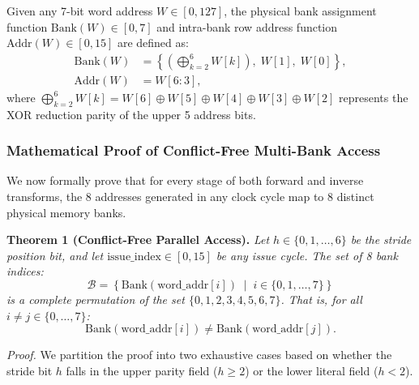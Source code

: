Given any 7-bit word address $W \in [0, 127]$, the physical bank assignment function $\text{Bank}(W) \in [0, 7]$ and intra-bank row address function $\text{Addr}(W) \in [0, 15]$ are defined as:
\begin{align}
\text{Bank}(W) &= \left\{ \left( \bigoplus_{k=2}^{6} W[k] \right), \; W[1], \; W[0] \right\}, \label{eq:bank_hash} \\
\text{Addr}(W) &= W[6:3], \label{eq:row_addr}
\end{align}
where $\bigoplus_{k=2}^6 W[k] = W[6] \oplus W[5] \oplus W[4] \oplus W[3] \oplus W[2]$ represents the XOR reduction parity of the upper 5 address bits.

\subsubsection{Mathematical Proof of Conflict-Free Multi-Bank Access}
We now formally prove that for every stage of both forward and inverse transforms, the 8 addresses generated in any clock cycle map to 8 distinct physical memory banks.

\textbf{Theorem 1 (Conflict-Free Parallel Access).} \textit{Let $h \in \{0, 1, \dots, 6\}$ be the stride position bit, and let $\text{issue\_index} \in [0, 15]$ be any issue cycle. The set of 8 bank indices:}
\begin{equation}
\label{eq:bank_set}
\mathcal{B} = \left\{ \text{Bank}(\text{word\_addr}[i]) \;\middle|\; i \in \{0, 1, \dots, 7\} \right\}
\end{equation}
\textit{is a complete permutation of the set $\{0, 1, 2, 3, 4, 5, 6, 7\}$. That is, for all $i \neq j \in \{0, \dots, 7\}$:}
\begin{equation}
\label{eq:bijection}
\text{Bank}(\text{word\_addr}[i]) \neq \text{Bank}(\text{word\_addr}[j]).
\end{equation}

\textit{Proof.} We partition the proof into two exhaustive cases based on whether the stride bit $h$ falls in the upper parity field ($h \ge 2$) or the lower literal field ($h < 2$).

